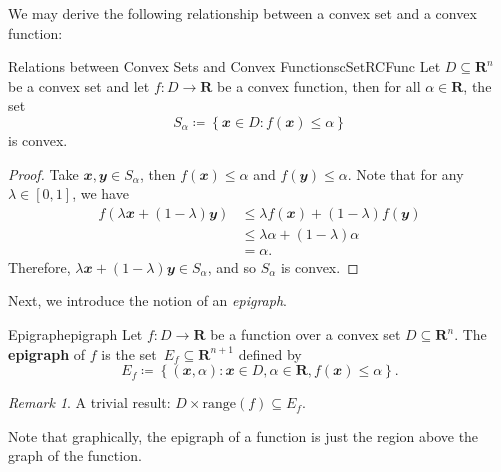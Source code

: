 \documentclass[math, code]{amznotes}
\theoremstyle{remark}
\newtheorem*{remark}{Remark}
\begin{document}
We may derive the following relationship between a convex set and a convex function:
\begin{probox}{Relations between Convex Sets and Convex Functions}{cSetRCFunc}
    Let $D \subseteq \mathbf{R}^n$ be a convex set and let $f \colon D \to \mathbf{R}$ be a convex function, then for all $\alpha \in \mathbf{R}$, the set
    \begin{displaymath}
        S_\alpha \coloneqq \left\{\mathbfit{x} \in D \colon f(\mathbfit{x}) \leq \alpha\right\}
    \end{displaymath}
    is convex.
    \tcblower   
    \begin{proof}
        Take $\mathbfit{x}, \mathbfit{y} \in S_\alpha$, then $f(\mathbfit{x}) \leq \alpha$ and $f(\mathbfit{y}) \leq \alpha$. Note that for any $\lambda \in [0, 1]$, we have
        \begin{align*}
            f\left(\lambda\mathbfit{x} + (1 - \lambda)\mathbfit{y}\right) & \leq \lambda f(\mathbfit{x}) + (1 - \lambda)f(\mathbfit{y}) \\
            & \leq \lambda\alpha + (1 - \lambda)\alpha \\
            & = \alpha.
        \end{align*}
        Therefore, $\lambda\mathbfit{x} + (1 - \lambda)\mathbfit{y} \in S_\alpha$, and so $S_\alpha$ is convex.
    \end{proof}
\end{probox}
Next, we introduce the notion of an \textit{epigraph}.
\begin{dfnbox}{Epigraph}{epigraph}
    Let $f \colon D \to \mathbf{R}$ be a function over a convex set $D \subseteq \mathbf{R}^n$. The {\color{red} \textbf{epigraph}} of $f$ is the set~$E_f \subseteq \mathbf{R}^{n + 1}$ defined by
    \begin{displaymath}
        E_f \coloneqq \left\{(\mathbfit{x}, \alpha) \colon \mathbfit{x} \in D, \alpha \in \mathbf{R}, f(\mathbfit{x}) \leq \alpha\right\}.
    \end{displaymath}
\end{dfnbox}
\begin{notebox}
    \begin{remark}
        A trivial result: $D \times \mathrm{range}(f) \subseteq E_f$.
    \end{remark}
\end{notebox}
Note that graphically, the epigraph of a function is just the region above the graph of the function.
\end{document}
